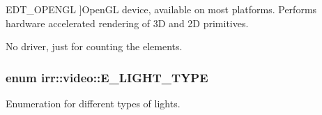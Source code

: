 \begin{Desc}
\begin{description}
{E\+D\+T\+\_\+\+O\+P\+E\+N\+GL\hypertarget{namespaceirr_1_1video_ae35a6de6d436c76107ad157fe42356d0a2715182a79f1cb8e2826fd68a8150a53}{}\label{namespaceirr_1_1video_ae35a6de6d436c76107ad157fe42356d0a2715182a79f1cb8e2826fd68a8150a53}
}]Open\+GL device, available on most platforms. Performs hardware accelerated rendering of 3D and 2D primitives. \item[{\em 
E\+D\+T\+\_\+\+C\+O\+U\+NT\hypertarget{namespaceirr_1_1video_ae35a6de6d436c76107ad157fe42356d0ae685cada50f8c100403134d932d0414c}{}\label{namespaceirr_1_1video_ae35a6de6d436c76107ad157fe42356d0ae685cada50f8c100403134d932d0414c}
}]No driver, just for counting the elements. \end{description}
\end{Desc}
\subsubsection[{\texorpdfstring{E\+\_\+\+L\+I\+G\+H\+T\+\_\+\+T\+Y\+PE}{E\_LIGHT\_TYPE}}]{\setlength{\rightskip}{0pt plus 5cm}enum {\bf irr\+::video\+::\+E\+\_\+\+L\+I\+G\+H\+T\+\_\+\+T\+Y\+PE}}\hypertarget{namespaceirr_1_1video_aaf0e02f6f83cc35cf9e764bf18400d39}{}\label{namespaceirr_1_1video_aaf0e02f6f83cc35cf9e764bf18400d39}


Enumeration for different types of lights. 

